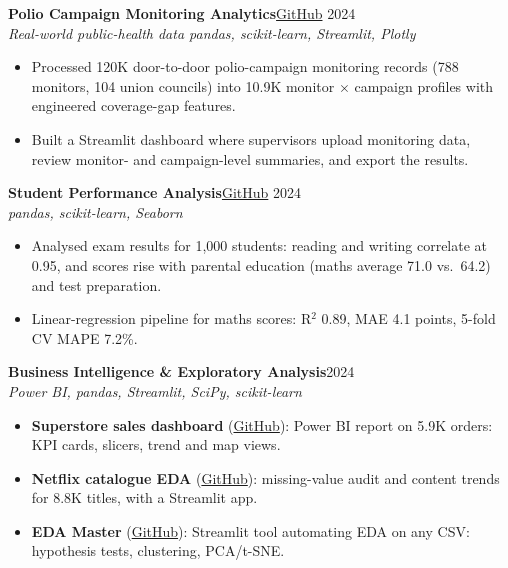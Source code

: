\documentclass[10pt,a4paper]{article}
\newcommand{\project}[3]{%
  \par\addvspace{5pt}\needspace{6\baselineskip}\textbf{#1}\hfill{\small #2}\\[-1pt]
  {\small\itshape\color{muted} #3}\par}
\begin{document}
\project{Polio Campaign Monitoring Analytics}
  {\href{https://github.com/Shah-123/datascience/tree/main/ICM\%20Project}{GitHub} \textbar{} 2024}
  {Real-world public-health data \textbullet{} pandas, scikit-learn, Streamlit, Plotly}
\begin{itemize}
  \item Processed 120K door-to-door polio-campaign monitoring records (788 monitors, 104 union
        councils) into 10.9K monitor $\times$ campaign profiles with engineered coverage-gap features.
  \item Built a Streamlit dashboard where supervisors upload monitoring data, review monitor- and
        campaign-level summaries, and export the results.
\end{itemize}

\project{Student Performance Analysis}
  {\href{https://github.com/Shah-123/datascience/tree/main/Student_preformance}{GitHub} \textbar{} 2024}
  {pandas, scikit-learn, Seaborn}
\begin{itemize}
  \item Analysed exam results for 1,000 students: reading and writing correlate at 0.95, and scores
        rise with parental education (maths average 71.0 vs.\ 64.2) and test preparation.
  \item Linear-regression pipeline for maths scores: R$^2$ 0.89, MAE 4.1 points, 5-fold CV MAPE 7.2\%.
\end{itemize}

\project{Business Intelligence \& Exploratory Analysis}
  {2024}
  {Power BI, pandas, Streamlit, SciPy, scikit-learn}
\begin{itemize}
  \item \textbf{Superstore sales dashboard}
        (\href{https://github.com/Shah-123/PowerBI_projects}{GitHub}): Power BI report on 5.9K
        orders: KPI cards, slicers, trend and map views.
  \item \textbf{Netflix catalogue EDA}
        (\href{https://github.com/Shah-123/datascience/blob/main/netflexEDA.ipynb}{GitHub}):
        missing-value audit and content trends for 8.8K titles, with a Streamlit app.
  \item \textbf{EDA Master}
        (\href{https://github.com/Shah-123/datascience/tree/main/EDA\%20App}{GitHub}): Streamlit tool
        automating EDA on any CSV: hypothesis tests, clustering, PCA/t-SNE.
\end{itemize}

\end{document}
